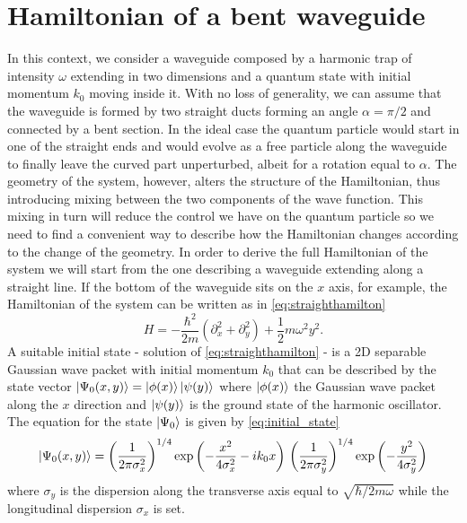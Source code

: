 \section{Hamiltonian of a bent waveguide}
In this context, we consider a waveguide composed by a harmonic trap of intensity $ \omega $ extending in two dimensions and a quantum state with initial momentum $ k_0 $  moving inside it.
With no loss of generality, we can assume that the waveguide is formed by two straight ducts forming an angle $\alpha = \pi/2$ and connected by a bent section.
In the ideal case the quantum particle would start in one of the straight ends and would evolve as a free particle along the waveguide to finally leave the curved part unperturbed, albeit for a rotation equal to $ \alpha $.
The geometry of the system, however, alters the structure of the Hamiltonian, thus introducing mixing between the two components of the wave function.
This mixing in turn will reduce the control we have on the quantum particle so we need to find a convenient way to describe how the Hamiltonian changes according to the change of the geometry.
In order to derive the full Hamiltonian of the system we will start from the one describing a waveguide extending along a straight line. 	
If the bottom of the waveguide sits on the $ x $ axis, for example, the Hamiltonian of the system can be written as in \cref{eq:straighthamilton}
\begin{equation}
	\label{eq:straighthamilton}
	 H = -\frac{\hbar^2}{2m} \left(\partial_{x}^{2} + \partial_{y}^{2}\right) + \frac{1}{2}m\omega^2y^2.
\end{equation}
A suitable initial state - solution of \cref{eq:straighthamilton} - is a 2D separable Gaussian wave packet with initial momentum $ k_0 $ that can be described by the state vector $ \ket{\Psi_{0}(x,y)} = \ket{\phi(x)}\ket{\psi(y)} $  where $ \ket{\phi(x)} $ the Gaussian wave packet along the $ x $ direction and $ \ket{\psi(y)} $ is the ground state of the harmonic oscillator.
The equation for the state $ \ket{\Psi_0}$ is given by \cref{eq:initial_state} 
\begin{dmath}
\label{eq:initial_state}
\ket{\Psi_{0}(x,y)} = \left(\frac{1}{2 \pi \sigma_{x}^{2}}\right)^{1/4}\exp\left(- \frac{x^{2}}{4\sigma_{x}^{2}} - i k_{0}x  \right)\\
	\left(\frac{1}{2\pi\sigma_{y}^{2}}\right)^{1/4}\exp\left(-\frac{y^{2}}{4\sigma_{y}^{2}}\right)
\end{dmath}
where $ \sigma_{y} $  is the dispersion along the transverse axis equal to $\sqrt{\hbar/2 m \omega}$ while the longitudinal dispersion $ \sigma_{x} $ is set.
